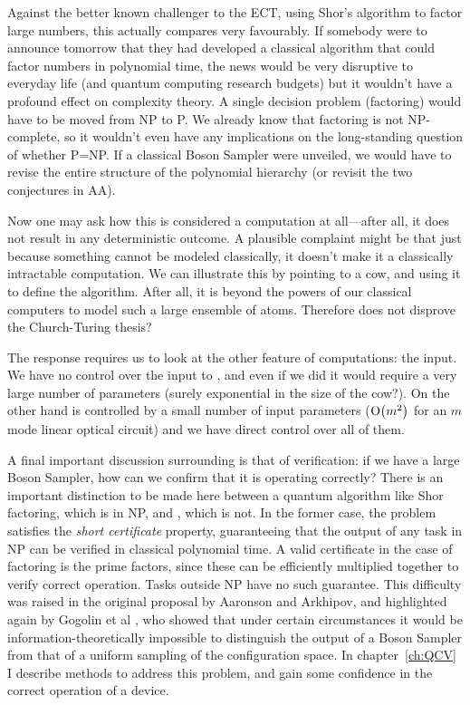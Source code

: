 Against the better known challenger to the ECT, using Shor's algorithm to factor
large numbers, this actually compares very favourably. If somebody were to
announce tomorrow that they had developed a classical algorithm that could
factor numbers in polynomial time, the news would be very disruptive to
everyday life (and quantum computing research budgets) but it wouldn't have a
profound effect on complexity theory. A single decision problem (factoring)
would have to be moved from NP to P. We already know that factoring is not
NP-complete, so it wouldn't even have any implications on the long-standing
question of whether P=NP. If a classical Boson Sampler were unveiled, we would
have to revise the entire structure of the polynomial hierarchy (or revisit the
two conjectures in AA).

Now one may ask how this is considered a computation at all---after
all, it does not result in any deterministic outcome. A plausible
complaint might be that just because something cannot be modeled classically,
it doesn't make it a classically intractable computation. We can illustrate
this by pointing to a cow, and using it to define the  algorithm.
After all, it is beyond the powers of our classical computers to model such a
large ensemble of atoms. Therefore does  not disprove the
Church-Turing thesis?

The response requires us to look at the other feature of computations: the
input. We have no control over the input to , and even if we did it
would require a very large number of parameters (surely exponential in the size
of the cow?). On the other hand \bosonsampling{} is controlled by a small number
of input parameters (\(\mathrm{O} \!\left(m^{2}\right)\) for an \(m\) mode linear optical
circuit) and we have direct control over all of them.

A final important discussion surrounding \bosonsampling{} is that of
verification: if we have a large Boson Sampler, how can we confirm that it is
operating correctly? There is an important distinction to be made here between
a quantum algorithm like Shor factoring, which is in NP, and \bosonsampling{},
which is not. In the former case, the problem satisfies the \emph{short
certificate} property, guaranteeing that the output of any task in NP can be
verified in classical polynomial time. A valid certificate in the case of
factoring is the prime factors, since these can be efficiently multiplied
together to verify correct operation. Tasks outside NP have no such guarantee.
This difficulty was raised in the original proposal by Aaronson and Arkhipov,
and highlighted again by Gogolin et al \cite{gogolin}, who showed that under
certain circumstances it would be information-theoretically impossible to
distinguish the output of a Boson Sampler from that of a uniform sampling of the
configuration space. In chapter~\ref{ch:QCV} I describe methods to address this
problem, and gain some confidence in the correct operation of a \bosonsampling{}
device.
